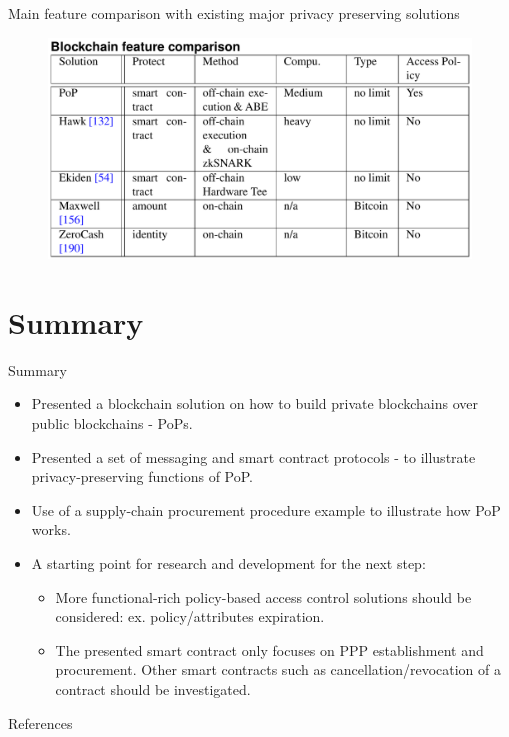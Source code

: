 \documentclass[11pt]{beamer}
\begin{document}
\begin{frame}{Main feature comparison with existing major privacy preserving solutions}

\begin{figure}
\includegraphics[scale=0.3]{blockchainfeatcomp.png}
\end{figure}

\end{frame}

\section{Summary}
\begin{frame}{Summary}
\begin{itemize}
	\item Presented a blockchain solution on how to build private blockchains over public blockchains - PoPs.
	\item Presented a set of messaging and smart contract protocols - to illustrate privacy-preserving functions of PoP.
	\item Use of a supply-chain procurement procedure example to illustrate how PoP works.
	\item A starting point for research and development for the next step:
	\begin{itemize}
		\item More functional-rich policy-based access control solutions should be considered: ex. policy/attributes expiration.
		\item The presented smart contract only focuses on PPP establishment and procurement. Other smart contracts such as cancellation/revocation of a contract should be investigated.
	\end{itemize}
\end{itemize}
\end{frame}

\begin{frame}[allowframebreaks]{References}
\printbibliography
\end{frame}
\end{document}
